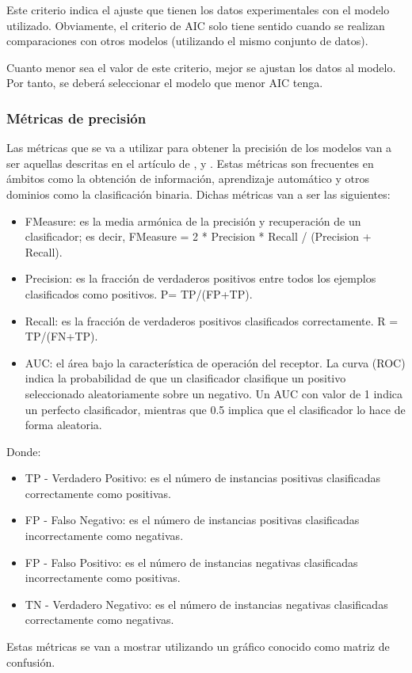Este criterio indica el ajuste que tienen los datos experimentales con el modelo utilizado. Obviamente, el criterio de AIC solo tiene sentido cuando se realizan comparaciones con otros modelos (utilizando el mismo conjunto de datos). \cite{martinez2009criterio}

Cuanto menor sea el valor de este criterio, mejor se ajustan los datos al modelo. Por tanto, se deberá seleccionar el modelo que menor AIC tenga. \cite{martinez2009criterio}

\subsubsection{Métricas de precisión}
Las métricas que se va a utilizar para obtener la precisión de los modelos van a ser aquellas descritas en el artículo de  ,  y . Estas métricas son frecuentes en ámbitos como la obtención de información, aprendizaje automático y otros dominios como la clasificación binaria. Dichas métricas van a ser las siguientes:

\begin{itemize}
	\item FMeasure: es la media armónica de la precisión y recuperación de un clasificador; es decir, FMeasure = 2 * Precision * Recall / (Precision + Recall).
	\item Precision: es la fracción de verdaderos positivos entre todos los ejemplos clasificados como positivos. P= TP/(FP+TP).
	\item Recall: es la fracción de verdaderos positivos clasificados correctamente. R = TP/(FN+TP).
	\item AUC: el área bajo la característica de operación del receptor. La curva (ROC) indica la probabilidad de que un clasificador clasifique un positivo seleccionado aleatoriamente sobre un negativo. Un AUC con valor de 1 indica un perfecto clasificador, mientras que 0.5 implica que el clasificador lo hace de forma aleatoria.
\end{itemize}

Donde:
\begin{itemize}
	\item TP - Verdadero Positivo: es el número de instancias positivas clasificadas correctamente como positivas. 
	\item FP - Falso Negativo: es el número de instancias positivas clasificadas incorrectamente como negativas.
	\item FP - Falso Positivo: es el número de instancias negativas clasificadas incorrectamente como positivas.
	\item TN - Verdadero Negativo: es el número de instancias negativas clasificadas correctamente como negativas.
\end{itemize}

Estas métricas se van a mostrar utilizando un gráfico conocido como matriz de confusión.
